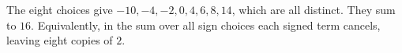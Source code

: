 The eight choices give $-10,-4,-2,0,4,6,8,14$, which are all distinct. They sum to $\boxed{16}$. Equivalently, in the sum over all sign choices each signed term cancels, leaving eight copies of $2$.
